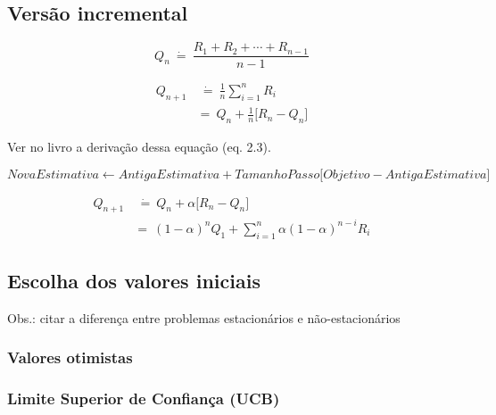 \documentclass{article}
\begin{document}
    \subsection{Versão incremental}
        
        \begin{equation}
            Q_n \ \dot{=} \ \frac{R_1 + R_2 + \cdots + R_{n-1}}{n - 1}
        \end{equation}
        
        \begin{equation}
        \begin{split}
            Q_{n+1} & \ \dot{=} \ \frac{1}{n} \sum_{i=1}^{n} R_i \\
            & = \ Q_n + \frac{1}{n} \Big[ R_n - Q_n \Big]
        \end{split}
        \end{equation}
        
        Ver no livro a derivação dessa equação (eq. 2.3).
        
        \begin{equation}
            NovaEstimativa \leftarrow AntigaEstimativa + TamanhoPasso \Big[ Objetivo - AntigaEstimativa \Big]
        \end{equation}
        
        \begin{equation}
        \begin{split}
            Q_{n+1} & \ \dot{=} \ Q_n + \alpha \Big[ R_n - Q_n \Big] \\
            & = \ (1 - \alpha)^n Q_1 + \sum_{i=1}^{n} \alpha (1 - \alpha)^{n - i} R_i
        \end{split}
        \end{equation}
        
    \subsection{Escolha dos valores iniciais}
        
        Obs.: citar a diferença entre problemas estacionários e não-estacionários
        
        \subsubsection{Valores otimistas}
        
        \subsubsection{Limite Superior de Confiança (UCB)}
        
\end{document}
